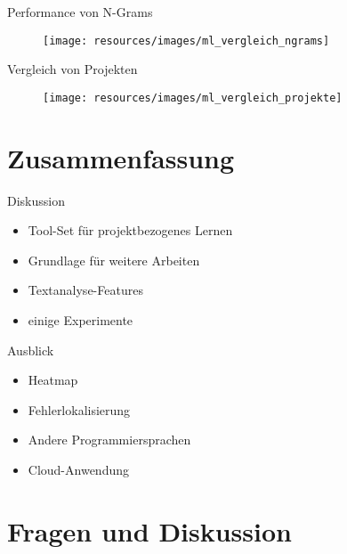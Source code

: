 \documentclass[12pt]{beamer}
\begin{document}
\begin{frame}[fragile]{Performance von N-Grams}
	\begin{figure}[h!]
		\centering
		\texttt{[image: resources/images/ml\_vergleich\_ngrams]}
	\end{figure}
\end{frame}

\begin{frame}[fragile]{Vergleich von Projekten}
	\begin{figure}[h!]
		\centering
		\texttt{[image: resources/images/ml\_vergleich\_projekte]}
	\end{figure}
\end{frame}

\section{Zusammenfassung}	%

\begin{frame}[fragile]{Diskussion}
	\begin{itemize}
		\item Tool-Set für projektbezogenes Lernen
		\item Grundlage für weitere Arbeiten
		\item Textanalyse-Features
		\item einige Experimente
	\end{itemize}
\end{frame}

\begin{frame}[fragile]{Ausblick}
	\begin{itemize}
		\item Heatmap
		\item Fehlerlokalisierung
		\item Andere Programmiersprachen
		\item Cloud-Anwendung
	\end{itemize}
\end{frame}

\section{Fragen und Diskussion}
\end{document}
